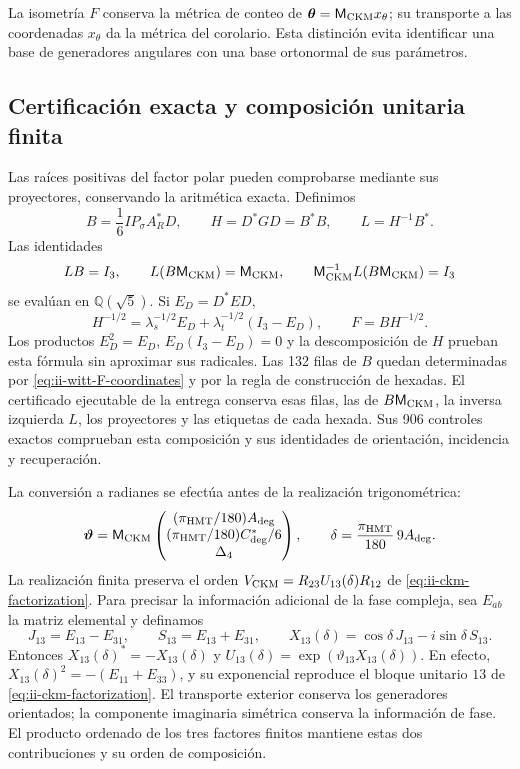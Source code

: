 La isometría \(F\) conserva la métrica de conteo de
\(\boldsymbol\theta=\mathsf M_{\rm CKM}x_\theta\); su transporte
a las coordenadas \(x_\theta\) da la métrica del corolario. Esta
distinción evita identificar una base de generadores angulares con una
base ortonormal de sus parámetros.

\subsection{Certificación exacta y composición unitaria finita}

Las raíces positivas del factor polar pueden comprobarse mediante sus
proyectores, conservando la aritmética exacta. Definimos
\begin{equation}
 B=\frac16IP_\sigma A_R^*D,\qquad
 H=D^*GD=B^*B,\qquad L=H^{-1}B^*.
 \label{eq:ii-witt-radical-free}
\end{equation}
Las identidades
\[
 LB=I_3,\qquad L(B\mathsf M_{\rm CKM})=\mathsf M_{\rm CKM},\qquad
 \mathsf M_{\rm CKM}^{-1}L(B\mathsf M_{\rm CKM})=I_3
\]
se evalúan en \(\mathbb Q(\sqrt5)\). Si \(E_D=D^*ED\),
\[
 H^{-1/2}=\lambda_s^{-1/2}E_D+
          \lambda_t^{-1/2}(I_3-E_D),\qquad F=BH^{-1/2}.
\]
Los productos \(E_D^2=E_D\), \(E_D(I_3-E_D)=0\) y la
descomposición de \(H\) prueban esta fórmula sin aproximar sus
radicales. Las 132 filas de \(B\) quedan determinadas por
\eqref{eq:ii-witt-F-coordinates} y por la regla de construcción de
hexadas. El certificado ejecutable de la entrega conserva esas filas,
las de \(B\mathsf M_{\rm CKM}\), la inversa izquierda \(L\),
los proyectores y las etiquetas de cada hexada. Sus 906 controles
exactos comprueban esta composición y sus identidades de orientación,
incidencia y recuperación.

La conversión a radianes se efectúa antes de la realización trigonométrica:
\begin{equation}
 \boldsymbol\vartheta=
 \mathsf M_{\rm CKM}
 \begin{pmatrix}(\pi_{\rm HMT}/180)A_{\rm deg}\\
 (\pi_{\rm HMT}/180)C^*_{\rm deg}/6\\\Delta_4\end{pmatrix},
 \qquad
 \delta=\frac{\pi_{\rm HMT}}{180}\,9A_{\rm deg}.
 \label{eq:ii-witt-angular-units}
\end{equation}
La realización finita preserva el orden
\(V_{\rm CKM}=R_{23}U_{13}(\delta)R_{12}\) de
\eqref{eq:ii-ckm-factorization}. Para precisar la información adicional
de la fase compleja, sea \(E_{ab}\) la matriz elemental y definamos
\[
 J_{13}=E_{13}-E_{31},\qquad S_{13}=E_{13}+E_{31},\qquad
 X_{13}(\delta)=\cos\delta\,J_{13}-i\sin\delta\,S_{13}.
\]
Entonces \(X_{13}(\delta)^*=-X_{13}(\delta)\) y
\(U_{13}(\delta)=\exp(\vartheta_{13}X_{13}(\delta))\).
En efecto, \(X_{13}(\delta)^2=-(E_{11}+E_{33})\), y su exponencial
reproduce el bloque unitario \(13\) de
\eqref{eq:ii-ckm-factorization}. El transporte exterior conserva los
generadores orientados; la componente imaginaria simétrica conserva
la información de fase. El producto ordenado de los tres factores
finitos mantiene estas dos contribuciones y su orden de composición.

